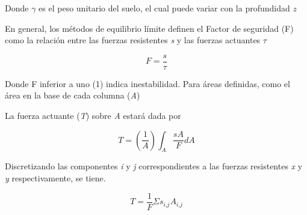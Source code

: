 Donde $ \gamma$ es el peso unitario del suelo, el cual puede variar con la profundidad $\textit{z}$

En general, los m\'etodos de equilibrio l\'imite definen el Factor de seguridad (F) como la relaci\'on entre las fuerzas resistentes  \textit{s} y las fuerzas actuantes $\tau$

$$F =\frac{\textit{s}}{\tau}$$

Donde F inferior a uno (1) indica inestabilidad. Para \'areas definidas, como el \'area en la base de cada columna (\textit{A})

La fuerza actuante (\textit{T}) sobre \textit{A} estar\'a dada por

$$\textit{T}=\left(\frac{1}{\textit{A}}\right)\int_{\textit{A}}^{} \frac{\textit{s}\textit{A}}{\textit{F}} \textit{dA}$$

Discretizando las componentes \textit{i} y \textit{j} correspondientes a las fuerzas resistentes \textit{x} y \textit{y} respectivamente, se tiene.

$$\textit{T} = \frac{1}{\textit{F}} \Sigma\textit{s}_{\textit{i,j}} \textit{A}_{\textit{i,j}}$$

